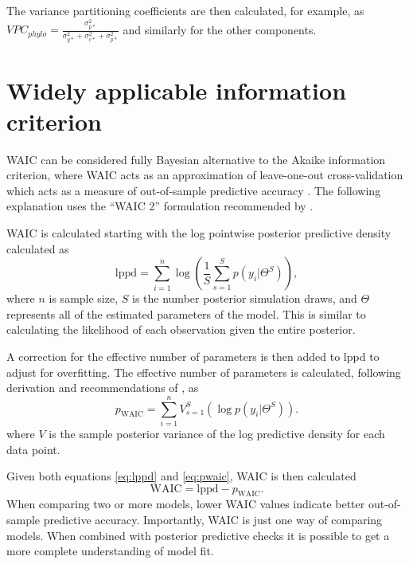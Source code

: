 \documentclass{article}
\begin{document}
The variance partitioning coefficients are then calculated, for example, as \(VPC_{phylo} = \frac{\sigma_{p*}^{2}}{\sigma_{y*}^{2} + \sigma_{c*}^{2} + \sigma_{p*}^{2}}\) and similarly for the other components.



\section{Widely applicable information criterion}
WAIC can be considered fully Bayesian alternative to the Akaike information criterion, where WAIC acts as an approximation of leave-one-out cross-validation which acts as a measure of out-of-sample predictive accuracy \cite{Gelman2013d}. The following explanation uses the ``WAIC 2'' formulation recommended by \cite{Gelman2013d}. 

WAIC is calculated starting with the log pointwise posterior predictive density calculated as
\begin{equation}
  \mathrm{lppd} = \sum_{i = 1}^{n} \log \left(\frac{1}{S} \sum_{s = 1}^{S} p(y_{i}|\Theta^{S})\right),
  \label{eq:lppd}
\end{equation}
where \(n\) is sample size, \(S\) is the number posterior simulation draws, and \(\Theta\) represents all of the estimated parameters of the model. This is similar to calculating the likelihood of each observation given the entire posterior.

A correction for the effective number of parameters is then added to lppd to adjust for overfitting. The effective number of parameters is calculated, following derivation and recommendations of \cite{Gelman2013d}, as
\begin{equation}
  p_{\mathrm{WAIC}} = \sum_{i = 1}^{n} V_{s = 1}^{S} (\log p(y_{i}|\Theta^{S})).
  \label{eq:pwaic}
\end{equation}
where \(V\) is the sample posterior variance of the log predictive density for each data point.

Given both equations \ref{eq:lppd} and \ref{eq:pwaic}, WAIC is then calculated
\begin{equation}
  \mathrm{WAIC} = \mathrm{lppd} - p_{\mathrm{WAIC}}.
  \label{eq:waic}
\end{equation}
When comparing two or more models, lower WAIC values indicate better out-of-sample predictive accuracy. Importantly, WAIC is just one way of comparing models. When combined with posterior predictive checks it is possible to get a more complete understanding of model fit.
\end{document}
